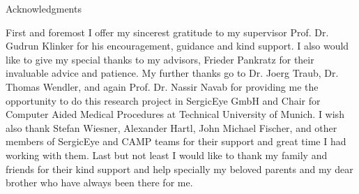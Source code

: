 \thispagestyle{empty}

\vspace*{2cm}

\begin{center}
{ Acknowledgments}
\end{center}

\vspace{1cm}

First and foremost I offer my sincerest gratitude to my supervisor Prof. Dr. Gudrun Klinker for his encouragement, guidance and kind support. I also would like to give my special thanks to my advisors, Frieder Pankratz  for their invaluable advice and patience.
My further thanks go to Dr. Joerg Traub, Dr. Thomas Wendler, and again Prof. Dr. Nassir Navab for providing me the opportunity to do this research project in SergicEye GmbH and Chair for Computer Aided Medical Procedures at Technical University of Munich. I wish also thank Stefan Wiesner, Alexander Hartl, John Michael Fischer, and other members of SergicEye and CAMP teams for their support and great time I had working with them.
Last but not least I would like to thank my family and friends for their kind support and help specially my beloved parents and my dear brother who have always been there for me.

\cleardoublepage{}
